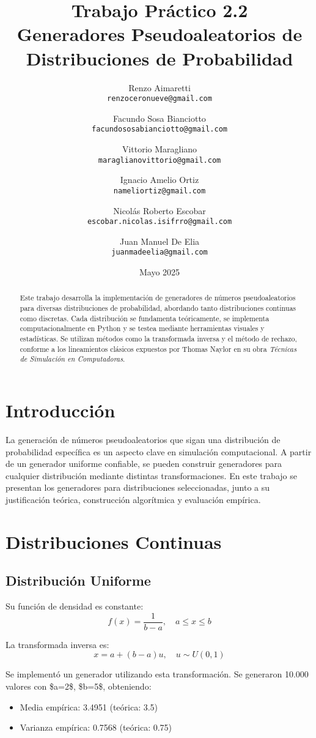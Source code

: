 \documentclass{article}
\title{Trabajo Práctico 2.2 \\
Generadores Pseudoaleatorios de Distribuciones de Probabilidad}
\author{
    Renzo Aimaretti \\ \texttt{renzoceronueve@gmail.com}
    \and
    Facundo Sosa Bianciotto \\ \texttt{facundososabianciotto@gmail.com}
    \and
    Vittorio Maragliano \\ \texttt{maraglianovittorio@gmail.com}
    \and
    Ignacio Amelio Ortiz \\ \texttt{nameliortiz@gmail.com}
    \and
    Nicolás Roberto Escobar \\ \texttt{escobar.nicolas.isifrro@gmail.com}
    \and
    Juan Manuel De Elia \\ \texttt{juanmadeelia@gmail.com}
}\date{Mayo 2025}
\begin{document}
\maketitle

\begin{abstract}
Este trabajo desarrolla la implementación de generadores de números pseudoaleatorios para diversas distribuciones de probabilidad, abordando tanto distribuciones continuas como discretas. Cada distribución se fundamenta teóricamente, se implementa computacionalmente en Python y se testea mediante herramientas visuales y estadísticas. Se utilizan métodos como la transformada inversa y el método de rechazo, conforme a los lineamientos clásicos expuestos por Thomas Naylor en su obra \textit{Técnicas de Simulación en Computadoras}.
\end{abstract}

\section{Introducción}
La generación de números pseudoaleatorios que sigan una distribución de probabilidad específica es un aspecto clave en simulación computacional. A partir de un generador uniforme confiable, se pueden construir generadores para cualquier distribución mediante distintas transformaciones. En este trabajo se presentan los generadores para distribuciones seleccionadas, junto a su justificación teórica, construcción algorítmica y evaluación empírica.

\section{Distribuciones Continuas}

\subsection{Distribución Uniforme}
Su función de densidad es constante:
\begin{equation}
f(x) = \frac{1}{b-a}, \quad a \leq x \leq b
\end{equation}

La transformada inversa es:
\begin{equation}
x = a + (b-a)u, \quad u \sim U(0,1)
\end{equation}

Se implementó un generador utilizando esta transformación. Se generaron 10.000 valores con \$a=2\$, \$b=5\$, obteniendo:
\begin{itemize}
\item Media empírica: 3.4951 (teórica: 3.5)
\item Varianza empírica: 0.7568 (teórica: 0.75)
\end{itemize}
\end{document}
